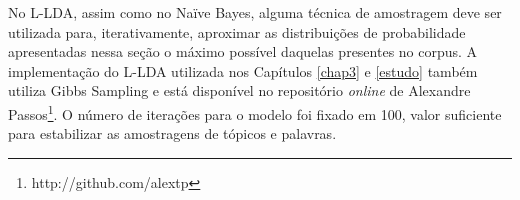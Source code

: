 No L-LDA, assim como no Naïve Bayes, alguma técnica de amostragem deve ser utilizada para, iterativamente, aproximar as distribuições de probabilidade apresentadas nessa seção o máximo possível daquelas presentes no corpus. A implementação do L-LDA utilizada nos Capítulos \ref{chap3} e \ref{estudo} também utiliza Gibbs Sampling e está disponível no repositório \emph{online} de Alexandre Passos\footnote{http://github.com/alextp}. O número de iterações para o modelo foi fixado em 100, valor suficiente para estabilizar as amostragens de tópicos e palavras.



  


